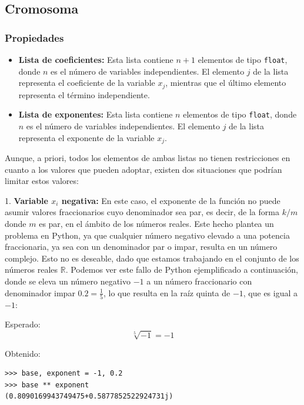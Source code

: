 \documentclass[conference,a4paper]{IEEEtran}
\begin{document}
\subsection{Cromosoma}

\subsubsection{Propiedades}
\begin{itemize}
    \item \textbf{Lista de coeficientes:} Esta lista contiene \( n + 1 \) elementos de tipo \texttt{float}, donde \( n \) es el número de variables independientes. El elemento \( j \) de la lista representa el coeficiente de la variable \( x_j \), mientras que el último elemento representa el término independiente.
    \item \textbf{Lista de exponentes:} Esta lista contiene \( n \) elementos de tipo \texttt{float}, donde \( n \) es el número de variables independientes. El elemento \( j \) de la lista representa el exponente de la variable \( x_j \).
\end{itemize}

Aunque, a priori, todos los elementos de ambas listas no tienen restricciones en cuanto a los valores que pueden adoptar, existen dos situaciones que podrían limitar estos valores:


1. \textbf{Variable \( x_i \) negativa:} En este caso, el exponente de la función no puede asumir valores fraccionarios cuyo denominador sea par, es decir, de la forma \( k/m \) donde \( m \) es par, en el ámbito de los números reales. Este hecho plantea un problema en Python, ya que cualquier número negativo elevado a una potencia fraccionaria, ya sea con un denominador par o impar, resulta en un número complejo. Esto no es deseable, dado que estamos trabajando en el conjunto de los números reales \( \mathbb{R} \). Podemos ver este fallo de Python ejemplificado a continuación, donde se eleva un número negativo \( -1 \) a un número fraccionario con denominador impar \( 0.2 = \frac{1}{5} \), lo que resulta en la raíz quinta de \(-1\), que es igual a \(-1\):

Esperado:
\[
\sqrt[5]{-1} = -1
\]

Obtenido:
\begin{verbatim}
>>> base, exponent = -1, 0.2
>>> base ** exponent
(0.8090169943749475+0.5877852522924731j)
\end{verbatim}
\end{document}
